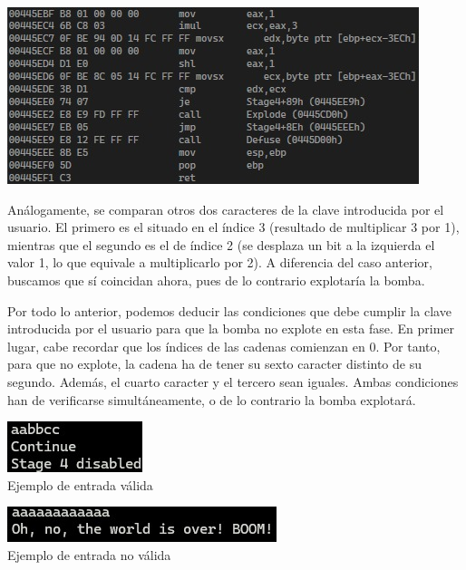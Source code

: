 \documentclass[11pt,a4paper]{article}
\begin{document}
\begin{center}
  \includegraphics[width=\textwidth]{Stage4/img5.png}
\end{center}

Análogamente, se comparan otros dos caracteres de la clave
introducida por el usuario. El primero es el situado en el índice 3 (resultado
de multiplicar 3 por 1), mientras que el segundo es el de índice 2 (se desplaza
un bit a la izquierda el valor 1, lo que equivale a multiplicarlo por 2). A diferencia
del caso anterior, buscamos que sí coincidan ahora, pues de lo contrario explotaría la bomba.

\vspace{2mm}
Por todo lo anterior, podemos deducir las condiciones que debe cumplir la clave
introducida por el usuario para que la bomba no explote en esta fase. En primer lugar,
cabe recordar que los índices de las cadenas comienzan en 0. Por tanto, para que no explote,
la cadena ha de tener su sexto caracter distinto de su segundo. Además, el cuarto caracter
y el tercero sean iguales. Ambas condiciones han de verificarse simultáneamente, o de lo contrario
la bomba explotará.

\vspace{2mm}
\begin{center}
  \includegraphics[]{Stage4/img6.png} \\
  \noindent Ejemplo de entrada válida
\end{center}

\vspace{2mm}
\begin{center}
  \includegraphics[]{Stage4/img7.png} \\
  \noindent Ejemplo de entrada no válida
\end{center}
\newpage
\end{document}
